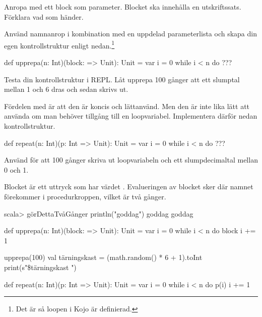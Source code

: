 \Subtask Anropa  med ett block som parameter. Blocket ska innehålla en utskriftssats. Förklara vad som händer.

\Subtask Använd namnanrop i kombination med en uppdelad parameterlista och skapa din egen kontrollstruktur enligt nedan.\footnote{Det är så loopen  i Kojo är definierad.}
\begin{Code}
def upprepa(n: Int)(block: => Unit): Unit =
  var i = 0
  while i < n do 
    ???
\end{Code}

\Subtask
Testa din kontrollstruktur i REPL. Låt upprepa 100 gånger att ett slumptal mellan 1 och 6 dras och sedan skrivs ut.

\Subtask Fördelen med  är att den är koncis och lättanvänd. Men den är inte lika lätt att använda om man behöver tillgång till en loopvariabel. Implementera därför nedan kontrollstruktur.

\begin{Code}
def repeat(n: Int)(p: Int => Unit): Unit = 
  var i = 0
  while i < n do
    ??? 
\end{Code}

\Subtask Använd  för att 100 gånger skriva ut loopvariabeln och ett slumpdecimaltal mellan 0 och 1.


\SOLUTION

\TaskSolved \what

\SubtaskSolved Blocket är ett uttryck som har värdet . Evalueringen av blocket sker där namnet  förekommer i procedurkroppen, vilket är två gånger.
\begin{REPL}
scala> görDettaTvåGånger { println("goddag") }
goddag
goddag
\end{REPL}

\SubtaskSolved
\begin{Code}
def upprepa(n: Int)(block: => Unit): Unit =
  var i = 0
  while i < n do
    block
    i += 1
\end{Code}

\SubtaskSolved
\begin{Code}
upprepa(100) {
  val tärningskast = (math.random() * 6 + 1).toInt
  print(s"\$tärningskast ")
}
\end{Code}


\SubtaskSolved
\begin{Code}
def repeat(n: Int)(p: Int => Unit): Unit = 
  var i = 0
  while i < n do
    p(i)
    i += 1
\end{Code}

